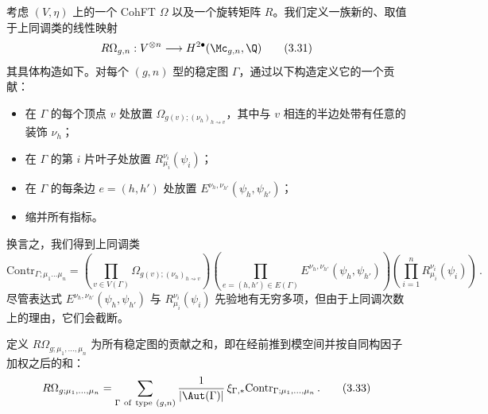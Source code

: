 \begin{definition}[3.3]
考虑 $(V,\eta)$ 上的一个 CohFT $\Omega$ 以及一个旋转矩阵 $R$。我们定义一族新的、取值于上同调类的线性映射
\begin{equation}
  R\Omega_{g,n}:V^{\otimes n}\longrightarrow H^{2\bullet}(\Mc_{g,n},\Q)
  \tag{3.31}
\end{equation}
其具体构造如下。对每个 $(g,n)$ 型的稳定图 $\Gamma$，通过以下构造定义它的一个贡献：
\begin{itemize}
\item 在 $\Gamma$ 的每个顶点 $v$ 处放置 $\Omega_{g(v);(\nu_{h})_{h\rightsquigarrow v}}$，其中与 $v$ 相连的半边处带有任意的装饰 $\nu_{h}$；
\item 在 $\Gamma$ 的第 $i$ 片叶子处放置 $R^{\nu_{i}}_{\mu_{i}}(\psi_{i})$；
\item 在 $\Gamma$ 的每条边 $e=(h,h')$ 处放置 $E^{\nu_{h},\nu_{h'}}(\psi_{h},\psi_{h'})$；
\item 缩并所有指标。
\end{itemize}
换言之，我们得到上同调类
\begin{equation}
  \mathrm{Contr}_{\Gamma;\mu_{1}\dots\mu_{n}}=\left(\prod_{v\in V(\Gamma)}\Omega_{g(v);(\nu_{h})_{h\rightsquigarrow v}}\right)\left(\prod_{e=(h,h')\in E(\Gamma)}E^{\nu_{h},\nu_{h'}}(\psi_{h},\psi_{h'})\right)\left(\prod_{i=1}^{n}R^{\nu_{i}}_{\mu_{i}}(\psi_{i})\right)\,.
  \tag{3.32}
\end{equation}
尽管表达式 $E^{\nu_{h},\nu_{h'}}(\psi_{h},\psi_{h'})$ 与 $R^{\nu_{i}}_{\mu_{i}}(\psi_{i})$ 先验地有无穷多项，但由于上同调次数上的理由，它们会截断。

定义 $R\Omega_{g;\mu_{1},\dots,\mu_{n}}$ 为所有稳定图的贡献之和，即在经前推到模空间并按自同构因子加权之后的和：
\begin{equation}
  R\Omega_{g;\mu_{1},\dots,\mu_{n}}=\sum_{\Gamma\ \mathrm{of\ type}\ (g,n)}\frac{1}{|\Aut(\Gamma)|}\,\xi_{\Gamma,*}\mathrm{Contr}_{\Gamma;\mu_{1},\dots,\mu_{n}}\,.
  \tag{3.33}
\end{equation}
\end{definition}

